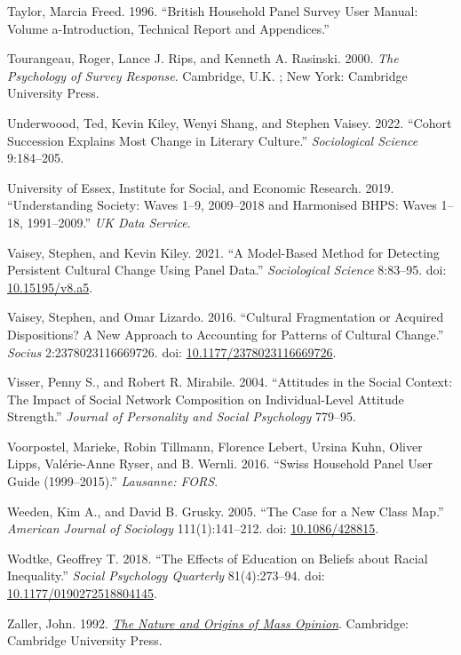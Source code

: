 \documentclass[
  11pt,
]{article}
\newlength{\cslhangindent}
\newenvironment{CSLReferences}[2] %
 {\begin{list}{}{%
  \setlength{\itemindent}{0pt}
  \setlength{\leftmargin}{0pt}
  \setlength{\parsep}{0pt}
  \ifodd #1
   \setlength{\leftmargin}{\cslhangindent}
   \setlength{\itemindent}{-1\cslhangindent}
  \fi
  \setlength{\itemsep}{#2\baselineskip}}}
 {\end{list}}
\begin{document}
\begin{CSLReferences}{1}{1}
Taylor, Marcia Freed. 1996. {``British Household Panel Survey User
Manual: Volume a-Introduction, Technical Report and Appendices.''}

Tourangeau, Roger, Lance J. Rips, and Kenneth A. Rasinski. 2000.
\emph{The Psychology of Survey Response}. Cambridge, U.K. ; New York:
Cambridge University Press.

Underwoood, Ted, Kevin Kiley, Wenyi Shang, and Stephen Vaisey. 2022.
{``Cohort Succession Explains Most Change in Literary Culture.''}
\emph{Sociological Science} 9:184--205.

University of Essex, Institute for Social, and Economic Research. 2019.
{``Understanding Society: Waves 1--9, 2009--2018 and Harmonised BHPS:
Waves 1--18, 1991--2009.''} \emph{UK Data Service}.

Vaisey, Stephen, and Kevin Kiley. 2021. {``A {Model}-{Based} {Method}
for {Detecting} {Persistent} {Cultural} {Change} {Using} {Panel}
{Data}.''} \emph{Sociological Science} 8:83--95. doi:
\href{https://doi.org/10.15195/v8.a5}{10.15195/v8.a5}.

Vaisey, Stephen, and Omar Lizardo. 2016. {``Cultural {Fragmentation} or
{Acquired} {Dispositions}? {A} {New} {Approach} to {Accounting} for
{Patterns} of {Cultural} {Change}.''} \emph{Socius} 2:2378023116669726.
doi:
\href{https://doi.org/10.1177/2378023116669726}{10.1177/2378023116669726}.

Visser, Penny S., and Robert R. Mirabile. 2004. {``Attitudes in the
Social Context: {The} Impact of Social Network Composition on
Individual-Level Attitude Strength.''} \emph{Journal of Personality and
Social Psychology} 779--95.

Voorpostel, Marieke, Robin Tillmann, Florence Lebert, Ursina Kuhn,
Oliver Lipps, Valérie-Anne Ryser, and B. Wernli. 2016. {``Swiss
Household Panel User Guide (1999--2015).''} \emph{Lausanne: FORS}.

Weeden, Kim A., and David B. Grusky. 2005. {``The {Case} for a {New}
{Class} {Map}.''} \emph{American Journal of Sociology} 111(1):141--212.
doi: \href{https://doi.org/10.1086/428815}{10.1086/428815}.

Wodtke, Geoffrey T. 2018. {``The {Effects} of {Education} on {Beliefs}
about {Racial} {Inequality}.''} \emph{Social Psychology Quarterly}
81(4):273--94. doi:
\href{https://doi.org/10.1177/0190272518804145}{10.1177/0190272518804145}.

Zaller, John. 1992.
\emph{\href{https://doi.org/10.1017/CBO9780511818691}{The {Nature} and
{Origins} of {Mass} {Opinion}}}. Cambridge: Cambridge University Press.

\end{CSLReferences}
\end{document}
